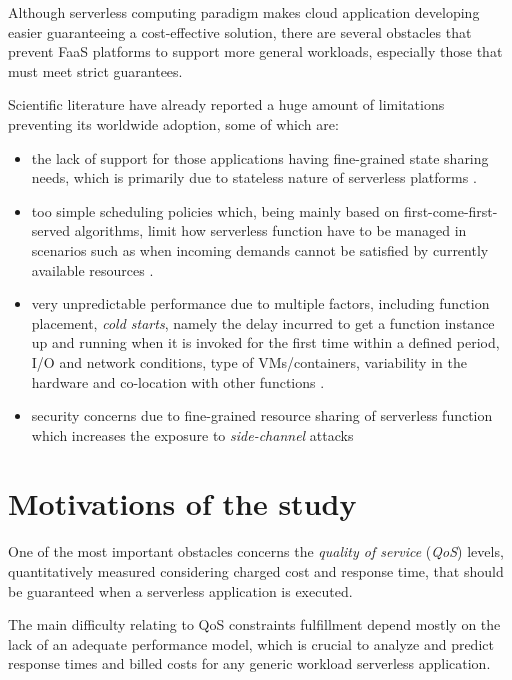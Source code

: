 \documentclass[12pt,a4paper]{report}
\begin{document}
Although serverless computing paradigm makes cloud application developing easier guaranteeing a cost-effective solution, there are several obstacles that prevent FaaS platforms to support more general workloads, especially those that must meet strict guarantees.

Scientific literature have already reported a huge amount of limitations preventing its worldwide adoption, some of which are:

\begin{itemize}
	
	\item the lack of support for those applications having fine-grained state sharing needs, which is primarily due to stateless nature of serverless platforms \cite{BerkeleyView}.
	
	\item too simple scheduling policies which, being mainly based on first-come-first-served algorithms, limit how serverless function have to be managed in scenarios such as when incoming demands cannot
	be satisfied by currently available resources \cite{Sequoia}.
	
	\item very unpredictable performance due to multiple factors, including function placement, \textit{cold starts}, namely the delay incurred to get a function instance up and running when it is invoked for the first time within a defined period, I/O and network conditions, type of VMs/containers, variability in the hardware and co-location with other functions \cite{COSE}\cite{BerkeleyView}.
	
	\item security concerns due to fine-grained resource sharing of serverless function which increases the exposure to \textit{side-channel} attacks \cite{NextPhase}
	
\end{itemize}

\section{Motivations of the study}

One of the most important obstacles concerns the \textit{quality of service} (\textit{QoS}) levels, quantitatively measured considering charged cost and response time, that should be guaranteed when a serverless application is executed.

The main difficulty relating to QoS constraints fulfillment depend mostly on the lack of an adequate performance model, which is crucial to analyze and predict response times and billed costs for any generic workload serverless application. 
\end{document}
